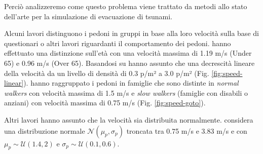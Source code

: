 Perciò analizzeremo come questo problema viene trattato da metodi allo stato dell'arte
per la simulazione di evacuazione di tsunami.

Alcuni lavori distinguono i pedoni in gruppi in base alla loro velocità sulla base di questionari o altri lavori riguardanti il comportamento dei pedoni.
\textcite{takabatake2017simulated} hanno effettuato una distinzione sull'età con una velocità massima di 1.19 m/s (Under 65) e 0.96 m/s (Over 65).
Basandosi su \textcite[]{older1968movement} hanno assunto che una decrescità lineare della velocità da un livello di densità di 0.3 p/m² a 3.0 p/m² (Fig. \ref{fig:speed-linear}).
\textcite{goto2012tsunami} hanno raggruppato i pedoni in famiglie che sono distinte in \textit{normal walkers} con velocità massima di 1.5 m/s e
\textit{slow walkers} (famiglie con disabili o anziani) con velocità massima di 0.75 m/s (Fig. \ref{fig:speed-goto}).

Altri lavori hanno assunto che la velocità sia distribuita normalmente.
\textcite{wang2021novel} considera una distribuzione normale $\mathcal{N}(\mu_p,\sigma_p)$ troncata tra 0.75 m/s e 3.83 m/s e
con $\mu_p \sim \mathcal{U}(1.4, 2)$ e $\sigma_p \sim \mathcal{U}(0.1, 0.6)$.


